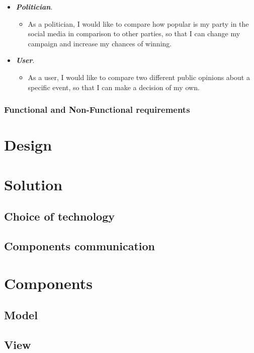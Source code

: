 \documentclass{l4proj}
\begin{document}
\begin{itemize}
	\item \textbf{\textit{Politician}}.
	\begin{itemize}
		\item As a politician, I would like to compare how popular is my party in the social media in comparison to other parties, so that I can change my campaign and increase my chances of winning.
	\end{itemize}
	
	\item \textbf{\textit{User}}.
	\begin{itemize}
		\item As a user, I would like to compare two different public opinions about a specific event, so that I can make a decision of my own. 
	\end{itemize}
\end{itemize}

\subsection{Functional and Non-Functional requirements} 

\chapter{Design}

\chapter{Solution}

\section{Choice of technology}

\section{Components communication}

\chapter{Components}

\section{Model}

\section{View}
\end{document}
